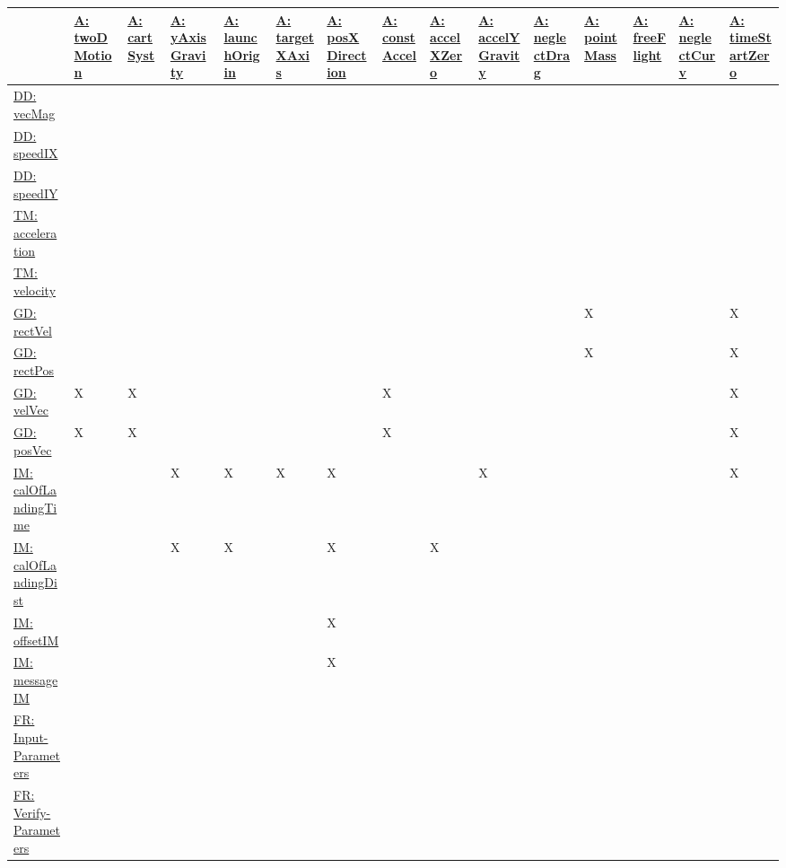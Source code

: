 \documentclass[12pt]{article}
\begin{document}
\begin{longtable}{l l l l l l l l l l l l l l l}
\toprule
 & \hyperref[twoDMotion]{A: twoDMotion} & \hyperref[cartSyst]{A: cartSyst} & \hyperref[yAxisGravity]{A: yAxisGravity} & \hyperref[launchOrigin]{A: launchOrigin} & \hyperref[targetXAxis]{A: targetXAxis} & \hyperref[posXDirection]{A: posXDirection} & \hyperref[constAccel]{A: constAccel} & \hyperref[accelXZero]{A: accelXZero} & \hyperref[accelYGravity]{A: accelYGravity} & \hyperref[neglectDrag]{A: neglectDrag} & \hyperref[pointMass]{A: pointMass} & \hyperref[freeFlight]{A: freeFlight} & \hyperref[neglectCurv]{A: neglectCurv} & \hyperref[timeStartZero]{A: timeStartZero}
\\
\midrule
\endhead
\hyperref[DD:vecMag]{DD: vecMag} &  &  &  &  &  &  &  &  &  &  &  &  &  & 
\\
\hyperref[DD:speedIX]{DD: speedIX} &  &  &  &  &  &  &  &  &  &  &  &  &  & 
\\
\hyperref[DD:speedIY]{DD: speedIY} &  &  &  &  &  &  &  &  &  &  &  &  &  & 
\\
\hyperref[TM:acceleration]{TM: acceleration} &  &  &  &  &  &  &  &  &  &  &  &  &  & 
\\
\hyperref[TM:velocity]{TM: velocity} &  &  &  &  &  &  &  &  &  &  &  &  &  & 
\\
\hyperref[GD:rectVel]{GD: rectVel} &  &  &  &  &  &  &  &  &  &  & X &  &  & X
\\
\hyperref[GD:rectPos]{GD: rectPos} &  &  &  &  &  &  &  &  &  &  & X &  &  & X
\\
\hyperref[GD:velVec]{GD: velVec} & X & X &  &  &  &  & X &  &  &  &  &  &  & X
\\
\hyperref[GD:posVec]{GD: posVec} & X & X &  &  &  &  & X &  &  &  &  &  &  & X
\\
\hyperref[IM:calOfLandingTime]{IM: calOfLandingTime} &  &  & X & X & X & X &  &  & X &  &  &  &  & X
\\
\hyperref[IM:calOfLandingDist]{IM: calOfLandingDist} &  &  & X & X &  & X &  & X &  &  &  &  &  & 
\\
\hyperref[IM:offsetIM]{IM: offsetIM} &  &  &  &  &  & X &  &  &  &  &  &  &  & 
\\
\hyperref[IM:messageIM]{IM: messageIM} &  &  &  &  &  & X &  &  &  &  &  &  &  & 
\\
\hyperref[inputParams]{FR: Input-Parameters} &  &  &  &  &  &  &  &  &  &  &  &  &  & 
\\
\hyperref[verifyParams]{FR: Verify-Parameters} &  &  &  &  &  &  &  &  &  &  &  &  &  & 
\\

\end{longtable}
\end{document}
